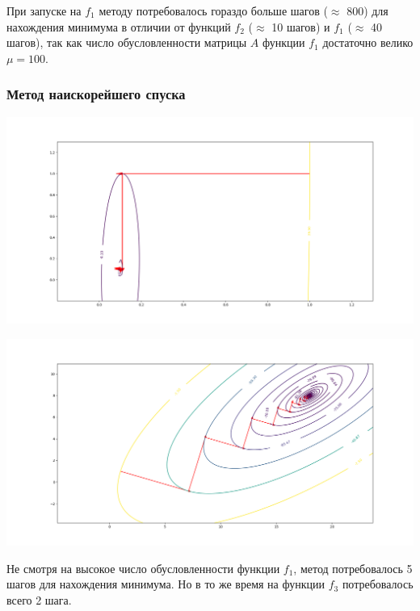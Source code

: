 \documentclass[english]{article}
\begin{document}
При запуске на \(f_1\) методу потребовалось гораздо больше шагов
(\(\approx\) 800) для нахождения минимума в отличии от функций \(f_2\)
(\(\approx\) 10 шагов) и \(f_1\) (\(\approx\) 40 шагов), так как число
обусловленности матрицы \(A\) функции \(f_1\) достаточно велико \(\mu
= 100\).
\subsubsection{Метод наискорейшего спуска}
\begin{center}
    \includegraphics[scale=0.3]{plots/traectories/steepest_descent_1.png}
\end{center}
\begin{center}
    \includegraphics[scale=0.3]{plots/traectories/steepest_descent_3.png}
\end{center}

Не смотря на высокое число обусловленности функции \(f_1\), метод
потребовалось 5 шагов для нахождения минимума. Но в то же время на
функции \(f_3\) потребовалось всего 2 шага.
\end{document}
